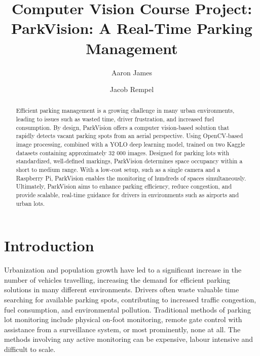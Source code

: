 \documentclass[12pt, letterpaper, oneside]{article}
\title{\textbf{Computer Vision Course Project:\\ParkVision: A Real-Time Parking Management}} %
\author{Aaron James \and Jacob Rempel} %
\affiliation{Ontario Tech University} %
\begin{document}
\maketitle

\begin{abstract}
    \noindent
    
    Efficient parking management is a growing challenge in many urban environments, leading to issues such as wasted time, driver frustration, and increased fuel consumption. By design, ParkVision offers a computer vision-based solution that rapidly detects vacant parking spots from an aerial perspective. Using OpenCV-based image processing, combined with a YOLO deep learning model, trained on two Kaggle datasets containing approximately 32 000 images. Designed for parking lots with standardized, well-defined markings, ParkVision determines space occupancy within a short to medium range. With a low-cost setup, such as a single camera and a Raspberry Pi, ParkVision enables the monitoring of hundreds of spaces simultaneously. Ultimately, ParkVision aims to enhance parking efficiency, reduce congestion, and provide scalable, real-time guidance for drivers in environments such as airports and urban lots.
    
\end{abstract}

\vspace{2.5cm}


\thispagestyle{firstpage}

\pagebreak


\newgeometry{} %

\section{Introduction}
\label{sec:intro}

Urbanization and population growth have led to a significant increase in the number of vehicles travelling, increasing the demand for efficient parking solutions in many different environments. Drivers often waste valuable time searching for available parking spots, contributing to increased traffic congestion, fuel consumption, and environmental pollution. Traditional methods of parking lot monitoring include physical on-foot monitoring, remote gate control with assistance from a surveillance system, or most prominently, none at all. The methods involving any active monitoring can be expensive, labour intensive and difficult to scale.
\end{document}
